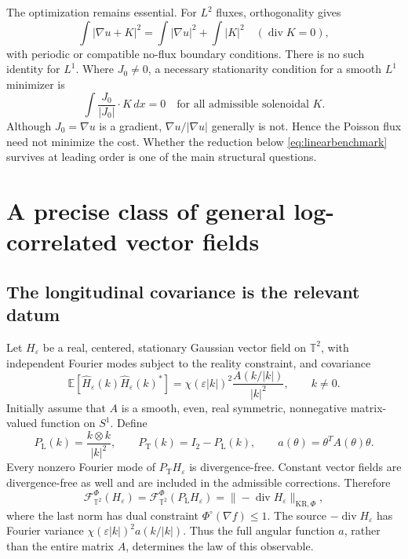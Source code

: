 \documentclass[11pt]{article}
\theoremstyle{definition}
\newcommand{\E}{\mathbb E}
\newcommand{\T}{\mathbb T}
\newcommand{\diver}{\operatorname{div}}
\newcommand{\KR}{\mathrm{KR}}
\newcommand{\cF}{\mathcal F}
\newcommand{\PL}{P_{\mathrm L}}
\newcommand{\PT}{P_{\mathrm T}}
\newcommand{\dd}{\,dx}
\begin{document}
The optimization remains essential. For $L^2$ fluxes, orthogonality gives
\[
  \int|\nabla u+K|^2
  =\int|\nabla u|^2+\int|K|^2
  \quad(\diver K=0),
\]
with periodic or compatible no-flux boundary conditions. There is no
such identity for $L^1$. Where $J_0\ne0$, a necessary stationarity
condition for a smooth $L^1$ minimizer is
\[
  \int\frac{J_0}{|J_0|}\cdot K\dd=0
  \quad\text{for all admissible solenoidal }K.
\]
Although $J_0=\nabla u$ is a gradient, $\nabla u/|\nabla u|$ generally is
not. Hence the Poisson flux need not minimize the cost. Whether the
reduction below \eqref{eq:linearbenchmark} survives at leading order is
one of the main structural questions.

\section{A precise class of general log-correlated vector fields}
\label{sec:general}

\subsection{The longitudinal covariance is the relevant datum}
Let $H_\varepsilon$ be a real, centered, stationary Gaussian vector field
on $\T^2$, with independent Fourier modes subject to the reality
constraint, and covariance
\begin{equation}\label{eq:generalcov}
  \E[\widehat H_\varepsilon(k)\widehat H_\varepsilon(k)^*]
  =\chi(\varepsilon|k|)^2\frac{A(k/|k|)}{|k|^2},
  \qquad k\ne0.
\end{equation}
Initially assume that $A$ is a smooth, even, real symmetric,
nonnegative matrix-valued function on $S^1$. Define
\[
  \PL(k)=\frac{k\otimes k}{|k|^2},\qquad
  \PT(k)=I_2-\PL(k),\qquad
  a(\theta)=\theta^TA(\theta)\theta.
\]
Every nonzero Fourier mode of $\PT H_\varepsilon$ is divergence-free.
Constant vector fields are divergence-free as well and are included in
the admissible corrections. Therefore
\begin{equation}\label{eq:quotient}
  \cF_{\T^2}^\Phi(H_\varepsilon)
  =\cF_{\T^2}^\Phi(\PL H_\varepsilon)
  =\| -\diver H_\varepsilon\|_{\KR,\Phi},
\end{equation}
where the last norm has dual constraint $\Phi^\circ(\nabla f)\leq1$.
The source $-\diver H_\varepsilon$ has Fourier variance
$\chi(\varepsilon|k|)^2a(k/|k|)$. Thus the full angular function $a$, rather
than the entire matrix $A$, determines the law of this observable.
\end{document}
